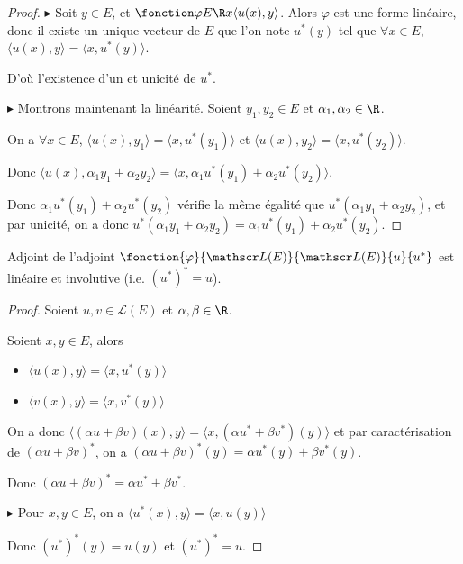 \begin{proof}
    $\blacktriangleright$ Soit $y \in E$, et $\fonction \varphi E \R x {\langle u(x), y \rangle}$. Alors $\varphi$ est une forme linéaire, 
    donc il existe un unique vecteur de $E$ que l'on note $u^*(y)$ tel que 
    $\forall x \in E$, $\langle u(x), y \rangle = \langle x, u^*(y) \rangle$.

    D'où l'existence d'un et unicité de $u^*$.

    \avspace $\blacktriangleright$ Montrons maintenant la linéarité. Soient $y_1, y_2 \in E$ et $\alpha_1, \alpha_2 \in \R$. 

    On a $\forall x \in E$, $\langle u(x), y_1 \rangle = \langle x, u^*(y_1) \rangle$ 
    et $\langle u(x), y_2 \rangle = \langle x, u^*(y_2) \rangle$.

    Donc $\langle u(x), \alpha_1 y_1 + \alpha_2 y_2 \rangle = \langle x, \alpha_1 u^*(y_1) + \alpha_2 u^*(y_2) \rangle$.

    Donc $\alpha_1 u^*(y_1) + \alpha_2 u^*(y_2)$ vérifie la même égalité que $u^*(\alpha_1 y_1 + \alpha_2 y_2)$, et par unicité,
    on a donc $u^*(\alpha_1 y_1 + \alpha_2 y_2) = \alpha_1 u^*(y_1) + \alpha_2 u^*(y_2)$.
\end{proof}

\begin{proposition}{Adjoint de l'adjoint}{}
    $\fonction{\varphi}{\mathscr L(E)}{\mathscr L(E)}{u}{u^*}$ est linéaire et involutive (i.e. $(u^*)^* = u$).
\end{proposition}

\begin{proof}
    Soient $u, v \in \mathscr L(E)$ et $\alpha, \beta \in \R$. 

    Soient $x, y \in E$, alors 
    \begin{itemize}
        \item $\langle u(x), y \rangle = \langle x, u^*(y) \rangle$ 
        \item $\langle v(x), y \rangle = \langle x, v^*(y) \rangle$
    \end{itemize}

    On a donc $\langle (\alpha u + \beta v)(x), y \rangle = \langle x, (\alpha u^* + \beta v^*)(y) \rangle$ 
    et par caractérisation de $(\alpha u + \beta v)^*$, on a 
    $(\alpha u + \beta v)^*(y) = \alpha u^*(y) + \beta v^*(y)$.

    Donc $(\alpha u + \beta v)^* = \alpha u^* + \beta v^*$.

    \avspace $\blacktriangleright$ Pour $x, y \in E$, on a 
    $\langle u^*(x), y \rangle = \langle x, u(y) \rangle$

    Donc $(u^*)^*(y) = u(y)$ et $(u^*)^* = u$.
\end{proof}

